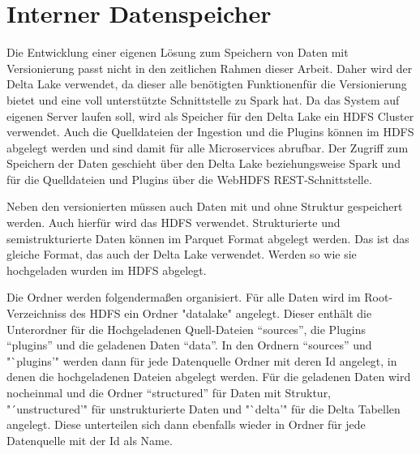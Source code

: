 \section{Interner Datenspeicher}

Die Entwicklung einer eigenen Lösung zum Speichern von Daten mit Versionierung passt nicht in den zeitlichen Rahmen dieser Arbeit.
Daher wird der Delta Lake verwendet, da dieser alle benötigten Funktionenfür die Versionierung bietet und eine voll unterstützte Schnittstelle zu Spark hat.
Da das System auf eigenen Server laufen soll, wird als Speicher für den Delta Lake ein HDFS Cluster verwendet.
Auch die Quelldateien der Ingestion und die Plugins können im HDFS abgelegt werden und sind damit für alle Microservices abrufbar.
Der Zugriff zum Speichern der Daten geschieht über den Delta Lake beziehungsweise Spark und für die Quelldateien und Plugins über die WebHDFS REST-Schnittstelle.

Neben den versionierten müssen auch Daten mit und ohne Struktur gespeichert werden.
Auch hierfür wird das HDFS verwendet.
Strukturierte und semistrukturierte Daten können im Parquet Format abgelegt werden.
Das ist das gleiche Format, das auch der Delta Lake verwendet.
Werden so wie sie hochgeladen wurden im HDFS abgelegt.

Die Ordner werden folgendermaßen organisiert.
Für alle Daten wird im Root-Verzeichniss des HDFS ein Ordner "datalake" angelegt.
Dieser enthält die Unterordner für die Hochgeladenen Quell-Dateien "`sources"', die Plugins "`plugins"' und die geladenen Daten "`data"'.
In den Ordnern "`sources"' und "`plugins'" werden dann für jede Datenquelle Ordner mit deren Id angelegt, in denen die hochgeladenen Dateien abgelegt werden.
Für die geladenen Daten wird nocheinmal und die Ordner "`structured"' für Daten mit Struktur, "´unstructured'" für unstrukturierte Daten und "`delta'" für die Delta Tabellen angelegt.
Diese unterteilen sich dann ebenfalls wieder in Ordner für jede Datenquelle mit der Id als Name.
